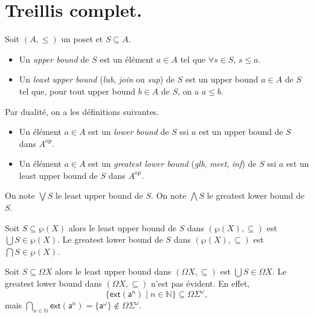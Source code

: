 \documentclass[./main]{subfiles}
\begin{document}
  \section{Treillis complet.}

  \begin{defn}
    Soit $(A, {\le})$ un poset et $S \subseteq A$.
    \begin{itemize}
      \item Un \textit{upper bound} de $S$ est un élément $a \in A$ tel que $\forall s \in S$, $s \le a$.
      \item Un \textit{least upper bound} (\textit{lub}, \textit{join} ou \textit{sup}) de $S$ est un upper bound $a \in A$ de $S$ tel que, pour tout upper bound $b \in A$ de $S$, on a $a \le b$.
    \end{itemize}

    Par dualité, on a les définitions suivantes.
    \begin{itemize}
      \item Un élément $a \in A$ est un \textit{lower bound} de $S$ ssi $a$ est un upper bound de $S$ dans $A^\mathrm{op}$.
      \item Un élément $a \in A$ est un \textit{greatest lower bound} (\textit{glb}, \textit{meet}, \textit{inf}) de $S$ ssi $a$ est un least upper bound de $S$ dans $A^\mathrm{op}$.
    \end{itemize}

    On note $\bigvee S$ le least upper bound de $S$.
    On note $\bigwedge S$ le greatest lower bound de $S$.
  \end{defn}

  \begin{exm}
    Soit $S \subseteq \wp(X)$ alors le least upper bound de $S$ dans $(\wp(X), \subseteq)$ est $\bigcup S \in \wp(X)$.
    Le greatest lower bound de $S$ dans $(\wp(X), \subseteq)$ est $\bigcap S \in \wp(X)$.
  \end{exm}

  \begin{exm}
    Soit $S \subseteq \Omega X$ alors le least upper bound dans ${(\Omega X, \subseteq)}$ est $\bigcup S \in \Omega X$.
    Le greatest lower bound dans $(\Omega X, \subseteq)$ n'est pas évident. En effet,
    \[
    \{\mathsf{ext}(\mathsf{a}^n)  \mid n \in \mathds{N}\}  \subseteq \Omega \Sigma^\omega
    ,\]
    mais $\bigcap_{n \in \mathds{N}} \mathsf{ext}(\mathsf{a}^n) = \{\mathsf{a}^\omega\} \not\in \Omega\Sigma^\omega$.
  \end{exm}
\end{document}

